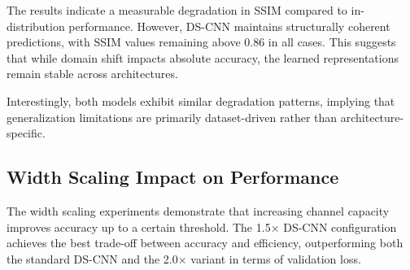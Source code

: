 \documentclass[conference]{IEEEtran}
\begin{document}
\vspace{0.5em}
\begin{table}[h]
\centering
\caption{Out-of-distribution generalization results on StdMetal and StdContact datasets. StdMetal is evaluated against ground truth, while StdContact measures consistency between Baseline and DS-CNN predictions (no ground-truth labels available).}
\label{tab:ood_generalization}

\end{table}


The results indicate a measurable degradation in SSIM compared to in-distribution performance. However, DS-CNN maintains structurally coherent predictions, with SSIM values remaining above 0.86 in all cases. This suggests that while domain shift impacts absolute accuracy, the learned representations remain stable across architectures.

Interestingly, both models exhibit similar degradation patterns, implying that generalization limitations are primarily dataset-driven rather than architecture-specific.

\subsection{\textbf{Width Scaling Impact on Performance}}

The width scaling experiments demonstrate that increasing channel capacity improves accuracy up to a certain threshold. The 1.5× DS-CNN configuration achieves the best trade-off between accuracy and efficiency, outperforming both the standard DS-CNN and the 2.0× variant in terms of validation loss.
\end{document}
